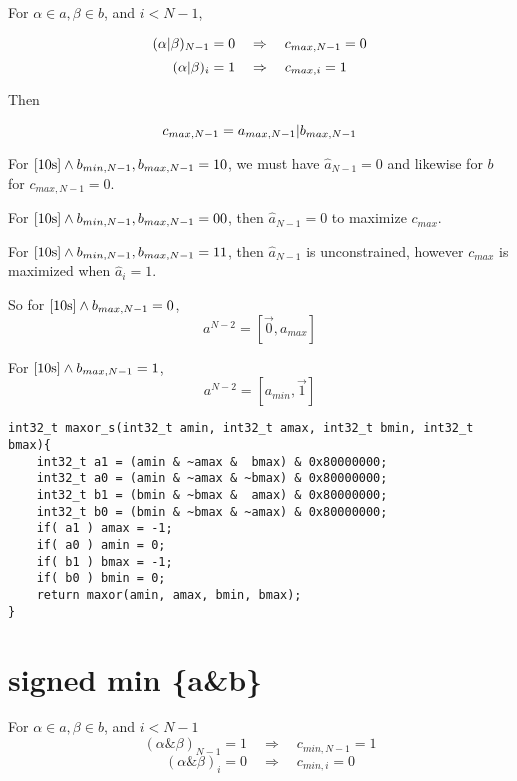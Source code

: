 \documentclass{article}
\begin{document}
For $\alpha \in a, \beta \in b$, and $i < N-1$,

\begin{equation} 
(\alpha \text{\textbar} \beta)_{N-1} = 0 \quad \Rightarrow \quad 
c_{max, N-1} = 0
\end{equation}
\begin{equation}
(\alpha\text{\textbar}\beta)_i = 1 
\quad \Rightarrow \quad 
c_{max,i} = 1
\end{equation}

Then

\begin{equation*}
c_{max,N-1} = a_{max,N-1} \text{\textbar} b_{max,N-1}
\end{equation*}

For $\eqref{10s} \wedge b_{min,N-1},b_{max,N-1} = 10$, we must have 
$\hat a_{N-1} = 0$ and likewise for $b$ for $c_{max,N-1} = 0$. 

For $\eqref{10s} \wedge b_{min,N-1},b_{max,N-1} = 00$, then 
$\hat a_{N-1} = 0$ to maximize $c_{max}$.

For $\eqref{10s} \wedge b_{min,N-1},b_{max,N-1} = 11$, then $\hat a_{N-1}$ 
is unconstrained, however $c_{max}$ is maximized when $\hat a_i = 1$. 

So for $\eqref{10s} \wedge b_{max,N-1} = 0$, 
\begin{equation*}
a^{N-2} = [\vec 0, a_{max}]
\end{equation*}

For $\eqref{10s} \wedge b_{max,N-1} = 1$, 
\begin{equation*}
a^{N-2} = [a_{min},\vec 1]
\end{equation*}

\begin{lstlisting}
int32_t maxor_s(int32_t amin, int32_t amax, int32_t bmin, int32_t bmax){
    int32_t a1 = (amin & ~amax &  bmax) & 0x80000000;
    int32_t a0 = (amin & ~amax & ~bmax) & 0x80000000;
    int32_t b1 = (bmin & ~bmax &  amax) & 0x80000000;
    int32_t b0 = (bmin & ~bmax & ~amax) & 0x80000000;
    if( a1 ) amax = -1;
    if( a0 ) amin = 0;
    if( b1 ) bmax = -1;
    if( b0 ) bmin = 0;
    return maxor(amin, amax, bmin, bmax);
}
\end{lstlisting}

\section{signed min \{a\&b\}}
For $\alpha \in a, \beta \in b$, and $i < N-1$
\begin{equation} 
(\alpha \& \beta)_{N-1} = 1 \quad \Rightarrow \quad c_{min, N-1} = 1
\end{equation}
\begin{equation}\label{maxand+}
(\alpha\&\beta)_i = 0 \quad \Rightarrow \quad 
c_{min,i} = 0
\end{equation}
\end{document}
